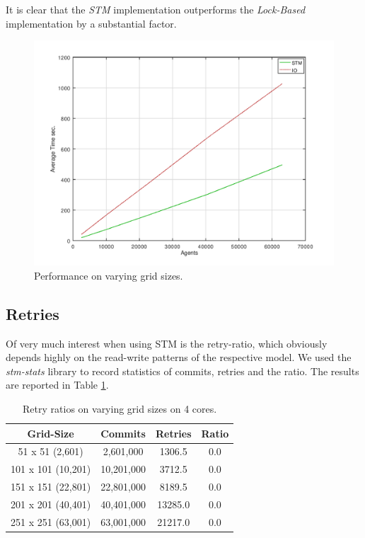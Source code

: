 It is clear that the \textit{STM} implementation outperforms the \textit{Lock-Based} implementation by a substantial factor.

\begin{figure}
	\centering
	\includegraphics[width=1\textwidth, angle=0]{./fig/concurrentabs/sir/stm_io_varyinggrid_performance.png}
	\caption{Performance on varying grid sizes.}
	\label{fig:varyinggrid_constcores}
\end{figure}

\subsection{Retries}
Of very much interest when using STM is the retry-ratio, which obviously depends highly on the read-write patterns of the respective model. We used the \textit{stm-stats} library to record statistics of commits, retries and the ratio. The results are reported in Table \ref{tab:retries_stm}.

\begin{table}
	\centering
  	\begin{tabular}{ c || c | c | c }
        Grid-Size 		   & Commits    & Retries & Ratio \\ \hline \hline 
   		51 x 51 (2,601)    & 2,601,000  & 1306.5  & 0.0 \\ \hline
   		101 x 101 (10,201) & 10,201,000 & 3712.5  & 0.0 \\ \hline
   		151 x 151 (22,801) & 22,801,000 & 8189.5  & 0.0 \\ \hline
   		201 x 201 (40,401) & 40,401,000 & 13285.0 & 0.0 \\ \hline 
   		251 x 251 (63,001) & 63,001,000 & 21217.0 & 0.0 \\ \hline \hline
  	\end{tabular}
  	
  	\caption{Retry ratios on varying grid sizes on 4 cores.}
	\label{tab:retries_stm}
\end{table}


